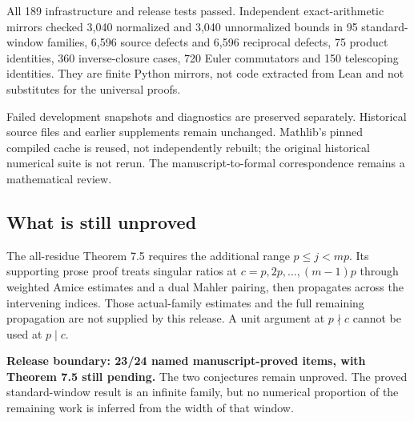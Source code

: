 All 189 infrastructure and release tests passed. Independent exact-arithmetic mirrors checked 3,040 normalized and 3,040 unnormalized bounds in 95 standard-window families, 6,596 source defects and 6,596 reciprocal defects, 75 product identities, 360 inverse-closure cases, 720 Euler commutators and 150 telescoping identities. They are finite Python mirrors, not code extracted from Lean and not substitutes for the universal proofs.

Failed development snapshots and diagnostics are preserved separately. Historical source files and earlier supplements remain unchanged. Mathlib's pinned compiled cache is reused, not independently rebuilt; the original historical numerical suite is not rerun. The manuscript-to-formal correspondence remains a mathematical review.

\subsection*{What is still unproved}
The all-residue Theorem 7.5 requires the additional range $p\le j<mp$. Its supporting prose proof treats singular ratios at $c=p,2p,\ldots,(m-1)p$ through weighted Amice estimates and a dual Mahler pairing, then propagates across the intervening indices. Those actual-family estimates and the full remaining propagation are not supplied by this release. A unit argument at $p\nmid c$ cannot be used at $p\mid c$.

\textbf{Release boundary: 23/24 named manuscript-proved items, with Theorem 7.5 still pending.} The two conjectures remain unproved. The proved standard-window result is an infinite family, but no numerical proportion of the remaining work is inferred from the width of that window.
